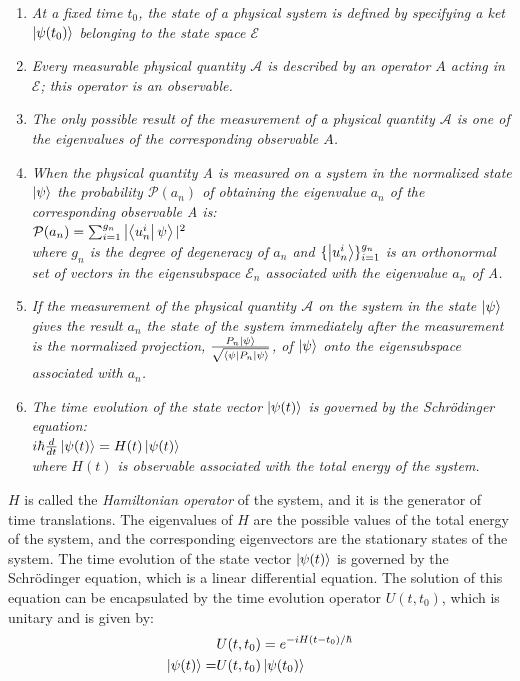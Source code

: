 \documentclass[
  journal=largetwo,
  year=2023,
]{cup-journal}
\begin{document}
\begin{enumerate}[itemsep=5px]
  \item \emph{At a fixed time \(t_0\), the state of a physical system is defined by specifying a ket \(\ket{\psi(t_0)}\) belonging to the state space \(\mathcal{E}\)}

  \item \emph{Every measurable physical quantity \(\mathcal{A}\) is described by an operator \(A\) acting in \(\mathcal{E}\); this operator is an observable.}

  \item \emph{The only possible result of the measurement of a physical quantity \(\mathcal{A}\) is one of the eigenvalues of the corresponding observable \(A\).}

  \item \emph{When the physical quantity A is measured on a system in the normalized state \(\ket{\psi}\) the probability \(\mathcal{P}(a_n)\)  of obtaining the eigenvalue \(a_n\) of the corresponding observable A is: \\
        \( \mathcal{P}(a_n) = \sum_{i=1}^{g_n}\ket{\bra{u_n^i}\psi}|^2 \) \\
        where \(g_n\) is the degree of degeneracy of \(a_n\) and \( \{ \ket{u_n^i} \}_{i=1}^{g_n} \) is an orthonormal set of vectors in the eigensubspace \(\mathcal{E}_n\) associated with the eigenvalue \(a_n\) of A.}

  \item \emph{If the measurement of the physical quantity \(\mathcal{A}\) on the system in the state \(\ket{\psi }\) gives the result \(a_n\) the state of the system immediately after the measurement is the normalized projection, \(\frac{P_n\ket{\psi }}{\sqrt{\bra{\psi }P_n\ket{\psi }} }\), of \(\ket{\psi }\) onto the eigensubspace associated with \(a_n\).}

  \item \emph{The time evolution of the state vector \(\ket{\psi (t)}\) is governed by the Schrödinger equation: \\
          \(i\hbar \frac{d}{dt}\ket{\psi(t)} = H(t)\ket{\psi(t)}\) \\
          where \(H(t)\) is observable associated with the total energy of the system.}\label{post:schroedinger}
\end{enumerate}

\noindent \(H\) is called the {\it Hamiltonian operator} of the system, and it is the generator of time translations. The eigenvalues of \(H\) are the possible values of the total energy of the system, and the corresponding eigenvectors are the stationary states of the system.
The time evolution of the state vector \(\ket{\psi(t)}\) is governed by the Schrödinger equation, which is a linear differential equation. The solution of this equation can be encapsulated by the time evolution operator \(U(t,t_0)\), which is unitary and is given by:
\begin{align}
                   & U(t,t_0)       = e^{-iH(t-t_0)/\hbar}     \\
  \ket{\psi(t)}  = & U(t,t_0)\ket{\psi(t_0)}\label{eq:unitary}
\end{align}
\end{document}
